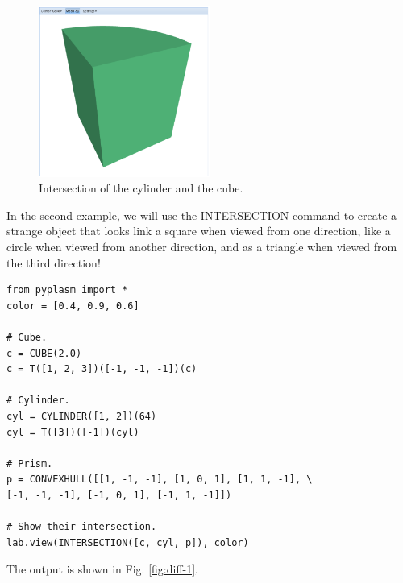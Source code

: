 \documentclass[article,A4,12pt]{llncs}
\begin{document}
\begin{figure}[!ht]
\begin{center}
\includegraphics[width=0.5\textwidth]{img/int-2.png}
\end{center}
\vspace{-2mm}
\caption{Intersection of the cylinder and the cube.}
\label{fig:int-2}
\end{figure}
\noindent
In the second example, we will use the INTERSECTION command to create 
a strange object that looks link a square when viewed
from one direction, like a circle when viewed from another direction, 
and as a triangle when viewed from the third direction!


\begin{verbatim}
from pyplasm import *
color = [0.4, 0.9, 0.6]

# Cube.
c = CUBE(2.0)
c = T([1, 2, 3])([-1, -1, -1])(c)

# Cylinder.
cyl = CYLINDER([1, 2])(64)
cyl = T([3])([-1])(cyl)

# Prism.
p = CONVEXHULL([[1, -1, -1], [1, 0, 1], [1, 1, -1], \
[-1, -1, -1], [-1, 0, 1], [-1, 1, -1]])

# Show their intersection.
lab.view(INTERSECTION([c, cyl, p]), color)
\end{verbatim}
The output is shown in Fig. \ref{fig:diff-1}.
\end{document}
